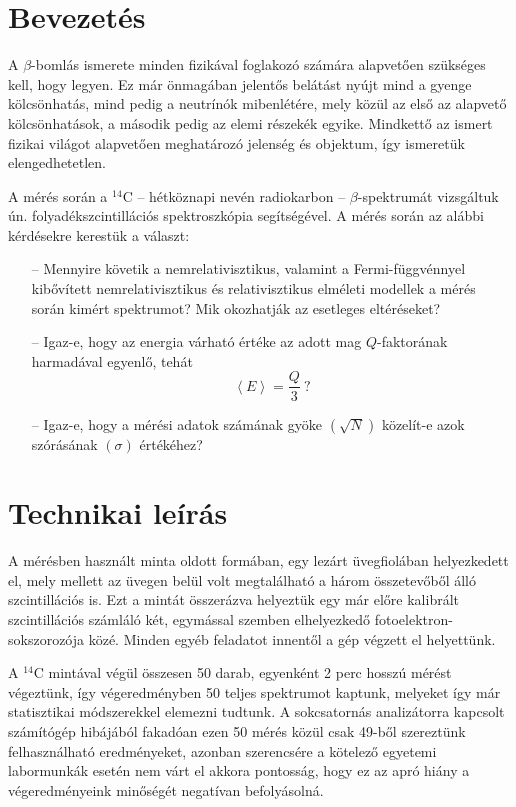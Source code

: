 \begin{multicols}{2}
\section{Bevezetés}
A $\beta$-bomlás ismerete minden fizikával foglakozó számára alapvetően szükséges kell, hogy legyen. Ez már önmagában jelentős belátást nyújt mind a gyenge kölcsönhatás, mind pedig a neutrínók mibenlétére, mely közül az első az alapvető kölcsönhatások, a második pedig az elemi részekék egyike. Mindkettő az ismert fizikai világot alapvetően meghatározó jelenség és objektum, így ismeretük elengedhetetlen. \par
A mérés során a $^{14}$C -- hétköznapi nevén radiokarbon -- $\beta$-spektrumát vizsgáltuk ún. folyadékszcintillációs spektroszkópia segítségével. A mérés során az alábbi kérdésekre kerestük a választ:
\begin{itemize}
\item[--] Mennyire követik a nemrelativisztikus, valamint a Fermi-függvénnyel kibővített nemrelativisztikus és relativisztikus elméleti modellek a mérés során kimért spektrumot? Mik okozhatják az esetleges eltéréseket?
\item[--] Igaz-e, hogy az energia várható értéke az adott mag $Q$-faktorának harmadával egyenlő, tehát
	\begin{equation*}
	\left< E \right> = \frac{Q}{3}\ \text{?}
	\end{equation*}
\item[--] Igaz-e, hogy a mérési adatok számának gyöke $\left( \sqrt{N} \right)$ közelít-e azok szórásának $\left( \sigma \right)$ értékéhez?
\end{itemize}

\section{Technikai leírás}
A mérésben használt minta oldott formában, egy lezárt üvegfiolában helyezkedett el, mely mellett az üvegen belül volt megtalálható a három összetevőből álló szcintillációs  is. Ezt a mintát összerázva helyeztük egy már előre kalibrált szcintillációs számláló két, egymással szemben elhelyezkedő fotoelektron-sokszorozója közé. Minden egyéb feladatot innentől a gép végzett el helyettünk. \par
A $^{14}$C mintával végül összesen 50 darab, egyenként 2 perc hosszú mérést végeztünk, így végeredményben 50 teljes spektrumot kaptunk, melyeket így már statisztikai módszerekkel elemezni tudtunk. A sokcsatornás analizátorra kapcsolt számítógép hibájából fakadóan ezen 50 mérés közül csak 49-ből szereztünk felhasználható eredményeket, azonban szerencsére a kötelező egyetemi labormunkák esetén nem várt el akkora pontosság, hogy ez az apró hiány a végeredményeink minőségét negatívan befolyásolná.


\end{multicols}
